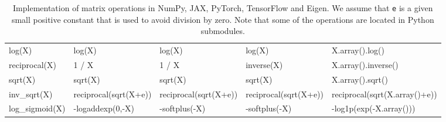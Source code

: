 \documentclass{article}
\begin{document}
\begin{table*}[htb]
\begin{tabular}{ p{2.2cm}|p{2.6cm}p{2.6cm}p{2.6cm}p{3.6cm} }
\textsf{log(X)}                & \textsf{log(X)}                 & \textsf{log(X)}                  & \textsf{log(X)}                      & \textsf{X.array().log()}                 \\
\textsf{reciprocal(X)}         & \textsf{1 / X}                  & \textsf{1 / X}                   & \textsf{inverse(X)}                  & \textsf{X.array().inverse()}             \\
\textsf{sqrt(X)}               & \textsf{sqrt(X)}                & \textsf{sqrt(X)}                 & \textsf{sqrt(X)}                     & \textsf{X.array().sqrt()}                \\
\textsf{inv\_sqrt(X)} & \textsf{reciprocal(sqrt(X+e))}  & \textsf{reciprocal(sqrt(X+e))}   & \textsf{reciprocal(sqrt(X+e))}       & \textsf{reciprocal(sqrt(X.array()+e))}   \\
\textsf{log\_sigmoid(X)}       & \textsf{-logaddexp(0,-X)}       & \textsf{-softplus(-X)}           & \textsf{-softplus(-X)}               & \textsf{-log1p(exp(-X.array()))}         \\
 \bottomrule
\end{tabular}
\caption{Implementation of matrix operations in NumPy, JAX, PyTorch, TensorFlow and Eigen.
We assume that \texttt{e} is a given small positive constant that is used to avoid division by zero. Note that some of the operations are located in Python submodules.
}
\label{table:matrix-operations-implementation}
\end{table*}
\end{document}
